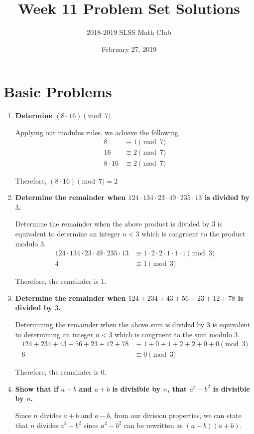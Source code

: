 \documentclass[12pt]{article}
\title{Week 11 Problem Set Solutions\vspace{-3mm}}
\author{2018-2019 SLSS Math Club\vspace{-5mm}}
\date{February 27, 2019\vspace{-5mm}}
\begin{document}
\maketitle

\section*{Basic Problems}
\begin{enumerate}
    \item \textbf{Determine $(8 \cdot 16) \pmod{7}$}
    
    Applying our modulus rules, we achieve the following
    \begin{align*}
        8 &\equiv 1 \pmod{7} \\
        16 &\equiv 2 \pmod{7} \\
        8 \cdot 16 &\equiv 2 \pmod{7}
    \end{align*}
    
    Therefore, $(8 \cdot 16) \pmod{7} = 2$
    
    \item \textbf{Determine the remainder when $124 \cdot 134 \cdot 23 \cdot 49 \cdot 235 \cdot 13$ is divided by $3$.}
    
    Determine the remainder when the above product is divided by $3$ is equivalent to determine an integer $n < 3$ which is congruent to the product modulo $3$.
    \begin{align*}
        124 \cdot 134 \cdot 23 \cdot 49 \cdot 235 \cdot 13 &\equiv 1 \cdot 2 \cdot 2 \cdot 1 \cdot 1 \cdot 1 \pmod{3} \\
        4 &\equiv 1 \pmod{3}
    \end{align*}
    
    Therefore, the remainder is $1$.
    
    \item \textbf{Determine the remainder when $124 + 234 + 43 + 56 + 23 + 12 + 78$ is divided by $3$.}
    
    Determining the remainder when the above sum is divided by $3$ is equivalent to determining an integer $n < 3$ which is congruent to the sum modulo $3$.
    \begin{align*}
        124 + 234 + 43 + 56 + 23 + 12 + 78 &\equiv 1 + 0 + 1 + 2 + 2 + 0 + 0 \pmod{3} \\
        6 &\equiv 0 \pmod 3
    \end{align*}
    
    Therefore, the remainder is $0$.
    
    \item \textbf{Show that if $a - b$ and $a + b$ is divisible by $n$, that $a^2 - b^2$ is divisible by $n$.}
    
    Since $n$ divides $a + b$ and $a - b$, from our division properties, we can state that $n$ divides $a^2 - b^2$ since $a^2 - b^2$ can be rewritten as $(a - b)(a + b)$.
    
\end{enumerate}
\end{document}
